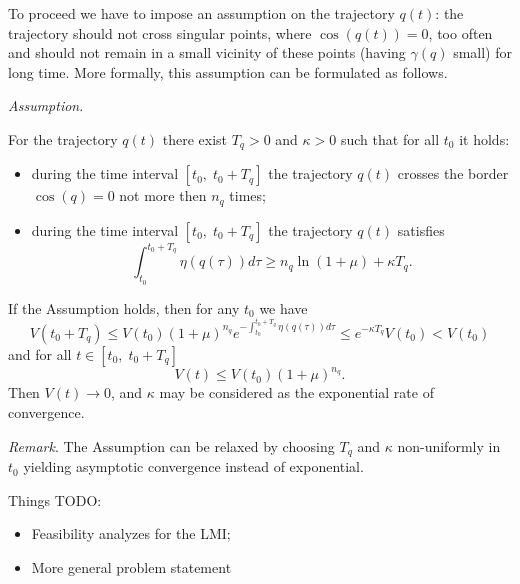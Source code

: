 To proceed we have to impose an assumption on the trajectory $q(t)$: the trajectory should not cross singular points, where $\cos(q(t))=0$, too often and should not remain in a small vicinity of these points (having $\gamma(q)$ small) for long time. More formally, this assumption can be formulated as follows.

\noindent\emph{Assumption}.

For the trajectory $q(t)$ there exist $T_q>0$ and $\kappa>0$ such that for all $t_0$ it holds:
\begin{itemize}
	\item during the time interval $[t_0, \; t_0+T_q]$ the trajectory $q(t)$ crosses the border $\cos(q)=0$ not more then $n_q$ times;
	\item during the time interval $[t_0, \; t_0+T_q]$ the trajectory $q(t)$ satisfies
	\[
		\int_{t_0}^{t_0+T_q}\eta(q(\tau))d\tau \ge n_q\ln\left(1+\mu\right) + \kappa T_q.
	\]
\end{itemize}

If the Assumption holds, then for any $t_0$ we have
\[
	V(t_0+T_q) \le V(t_0) \left(1+\mu\right)^{n_q} e^{-\int_{t_0}^{t_0+T_q}\eta(q(\tau))d\tau} \le e^{-\kappa T_q} V(t_0) <V(t_0)
\]
and for all $t\in [t_0, \; t_0+T_q]$
\[
	V(t) \le V(t_0)\left(1+\mu\right)^{n_q}.
\]
Then $V(t) \to 0$, and $\kappa$ may be considered as the exponential rate of convergence.

\noindent\emph{Remark}. The Assumption can be relaxed by choosing $T_q$ and $\kappa$ non-uniformly in $t_0$ yielding asymptotic convergence instead of exponential. 

Things TODO:
\begin{itemize}
\item Feasibility analyzes for the LMI;
\item More general problem statement  
\end{itemize}
